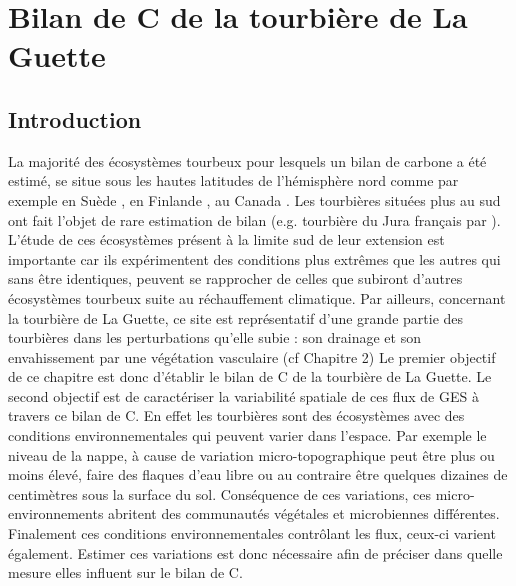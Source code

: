 \chapter{Bilan de C de la tourbière de La Guette}

\minitoc

\newpage

\section{Introduction}
La majorité des écosystèmes tourbeux pour lesquels un bilan de carbone a été estimé, se situe sous les hautes latitudes de l'hémisphère nord comme par exemple en Suède \citep{waddington2000,peichl2014}, en Finlande \citep{Alm1997}, au Canada \citep{trudeau2014}.
Les tourbières situées plus au sud ont fait l'objet de rare estimation de bilan (e.g. tourbière du Jura français par \citet{bortoluzzi2006}).
L'étude de ces écosystèmes présent à la limite sud de leur extension est importante car ils expérimentent des conditions plus extrêmes que les autres qui sans être identiques, peuvent se rapprocher de celles que subiront d'autres écosystèmes tourbeux suite au réchauffement climatique.
Par ailleurs, concernant la tourbière de La Guette, ce site est représentatif d'une grande partie des tourbières dans les perturbations qu'elle subie : son drainage et son envahissement par une végétation vasculaire (cf Chapitre 2)
Le premier objectif de ce chapitre est donc d'établir le bilan de C de la tourbière de La Guette.
Le second objectif est de caractériser la variabilité spatiale de ces flux de GES à travers ce bilan de C.
En effet les tourbières sont des écosystèmes avec des conditions environnementales qui peuvent varier dans l'espace.
Par exemple le niveau de la nappe, à cause de variation micro-topographique peut être plus ou moins élevé, faire des flaques d'eau libre ou au contraire être quelques dizaines de centimètres sous la surface du sol.
Conséquence de ces variations, ces micro-environnements abritent des communautés végétales et microbiennes différentes.
Finalement ces conditions environnementales contrôlant les flux, ceux-ci varient également.
Estimer ces variations est donc nécessaire afin de préciser dans quelle mesure elles influent sur le bilan de C.


